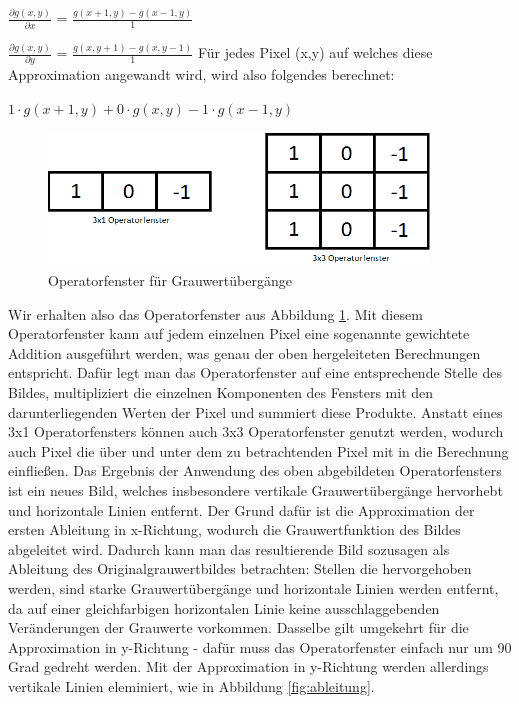 \documentclass[12pt, a4paper]{article}
\begin{document}
$\frac{\partial g(x,y)}{\partial x}$ = $\frac{g(x+1,y)-g(x-1,y)}{1}$
\newline

$\frac{\partial g(x,y)}{\partial y}$ = $\frac{g(x,y+1)-g(x,y-1)}{1}$
\newline
\newline
Für jedes Pixel (x,y) auf welches diese Approximation angewandt wird, wird also folgendes berechnet:
\newline

$1\cdot g(x+1,y)+0\cdot g(x,y)-1\cdot g(x-1,y)$
\newline

\begin{figure}[t]
\centering
\includegraphics[width=0.9\textwidth]{img/operatorfenster.png}
\caption{Operatorfenster für Grauwertübergänge}
\label{fig:OpFenster}
\end{figure}

Wir erhalten also das Operatorfenster aus Abbildung \ref{fig:OpFenster}. Mit diesem Operatorfenster kann auf jedem einzelnen Pixel eine sogenannte gewichtete Addition ausgeführt werden, was genau der oben hergeleiteten Berechnungen entspricht. Dafür legt man das Operatorfenster auf eine entsprechende Stelle des Bildes, multipliziert die einzelnen Komponenten des Fensters mit den darunterliegenden Werten der Pixel und summiert diese Produkte. Anstatt eines 3x1 Operatorfensters können auch 3x3 Operatorfenster genutzt werden, wodurch auch Pixel die über und unter dem zu betrachtenden Pixel mit in die Berechnung einfließen. Das Ergebnis der Anwendung des oben abgebildeten Operatorfensters ist ein neues Bild, welches insbesondere vertikale Grauwertübergänge hervorhebt und horizontale Linien entfernt. Der Grund dafür ist die Approximation der ersten Ableitung in x-Richtung, wodurch die Grauwertfunktion des Bildes abgeleitet wird. Dadurch kann man das resultierende Bild sozusagen als Ableitung des Originalgrauwertbildes betrachten: Stellen die hervorgehoben werden, sind starke Grauwertübergänge und horizontale Linien werden entfernt, da auf einer gleichfarbigen horizontalen Linie keine ausschlaggebenden Veränderungen der Grauwerte vorkommen. Dasselbe gilt umgekehrt für die Approximation in y-Richtung - dafür muss das Operatorfenster einfach nur um 90 Grad gedreht werden. Mit der Approximation in y-Richtung werden allerdings vertikale Linien eleminiert, wie in Abbildung \ref{fig:ableitung}.
\end{document}
